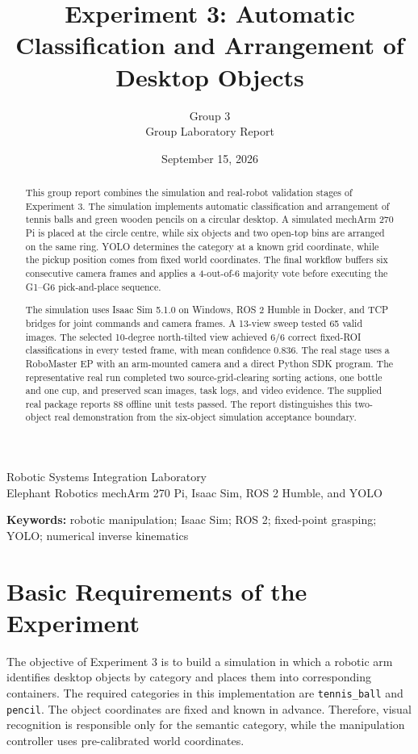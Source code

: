 \documentclass[12pt,a4paper]{article}
\title{\textbf{Experiment 3: Automatic Classification and Arrangement of Desktop Objects}}
\author{Group 3\\Group Laboratory Report}
\date{September 15, 2026}
\begin{document}
\maketitle
\thispagestyle{empty}
\begin{center}
Robotic Systems Integration Laboratory\\
Elephant Robotics mechArm 270 Pi, Isaac Sim, ROS 2 Humble, and YOLO
\end{center}
\vfill
\begin{abstract}
This group report combines the simulation and real-robot validation stages of Experiment 3. The simulation implements automatic classification and arrangement of tennis balls and green wooden pencils on a circular desktop. A simulated mechArm 270 Pi is placed at the circle centre, while six objects and two open-top bins are arranged on the same ring. YOLO determines the category at a known grid coordinate, while the pickup position comes from fixed world coordinates. The final workflow buffers six consecutive camera frames and applies a 4-out-of-6 majority vote before executing the G1--G6 pick-and-place sequence.

The simulation uses Isaac Sim 5.1.0 on Windows, ROS 2 Humble in Docker, and TCP bridges for joint commands and camera frames. A 13-view sweep tested 65 valid images. The selected 10-degree north-tilted view achieved 6/6 correct fixed-ROI classifications in every tested frame, with mean confidence 0.836. The real stage uses a RoboMaster EP with an arm-mounted camera and a direct Python SDK program. The representative real run completed two source-grid-clearing sorting actions, one bottle and one cup, and preserved scan images, task logs, and video evidence. The supplied real package reports 88 offline unit tests passed. The report distinguishes this two-object real demonstration from the six-object simulation acceptance boundary.
\end{abstract}

\noindent\textbf{Keywords:} robotic manipulation; Isaac Sim; ROS 2; fixed-point grasping; YOLO; numerical inverse kinematics

\clearpage
\tableofcontents
\clearpage

\section{Basic Requirements of the Experiment}

The objective of Experiment 3 is to build a simulation in which a robotic arm identifies desktop objects by category and places them into corresponding containers. The required categories in this implementation are \texttt{tennis\_ball} and \texttt{pencil}. The object coordinates are fixed and known in advance. Therefore, visual recognition is responsible only for the semantic category, while the manipulation controller uses pre-calibrated world coordinates.
\end{document}
